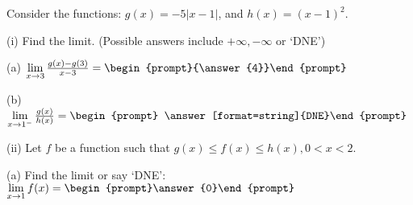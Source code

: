 \documentclass{ximera}
\author{Tom Dinitz and Nela Lakos}
\begin{document}
\begin{exercise}

	Consider the functions: $g(x)=-5|x-1|$, and $h(x)=(x-1)^2$.

	(i) Find the limit. (Possible answers include $+\infty, -\infty$ or `DNE')

	(a) $\lim\limits_{x\to 3} \frac{g(x)-g(3)}{x-3}=\begin{prompt}{\answer{4}}\end{prompt}$

	(b) $\lim\limits_{x\to 1^-} \frac{g(x)}{h(x)}=\begin{prompt} \answer[format=string]{DNE}\end{prompt}$

	(ii) Let $f$ be a function such that $g(x)\leq f(x)\leq h(x), 0<x<2$.

	(a) Find the limit or say `DNE': $\lim\limits_{x\to 1} f(x)= \begin{prompt}\answer{0}\end{prompt}$

\end{exercise}
\end{document}
